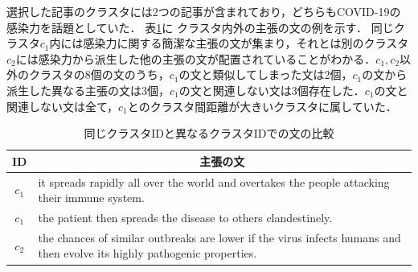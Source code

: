 \documentclass[a4paper, twocolumn, 10pt]{jarticle}
\begin{document}


選択した記事のクラスタには2つの記事が含まれており，どちらもCOVID-19の感染力を話題としていた．
表\ref{clustering_result_samples}に
クラスタ内外の主張の文の例を示す．
同じクラスタ$c_1$内には感染力に関する簡潔な主張の文が集まり，それとは別のクラスタ$c_2$には感染力から派生した他の主張の文が配置されていることがわかる．$c_1, c_2$以外のクラスタの8個の文のうち，$c_1$の文と類似してしまった文は2個，$c_1$の文から派生した異なる主張の文は3個，$c_1$の文と関連しない文は3個存在した．$c_1$の文と関連しない文は全て，$c_1$とのクラスタ間距離が大きいクラスタに属していた．

\begin{table}[H]
  \caption{
      同じクラスタIDと異なるクラスタIDでの文の比較
    }
  \centering
  {\tabcolsep=0.05cm
    \begin{tabular}{cp{7.5cm}}
    \hline
    ID & \multicolumn{1}{c}{主張の文}
    \\
    \hline
    $c_1$ & it spreads rapidly all over the world and overtakes the people attacking their immune system.
    \\
    $c_1$ & the patient then spreads the disease to others clandestinely.
    \\
    $c_2$ & the chances of similar outbreaks are lower if the virus infects humans and then evolve its highly pathogenic properties.
    \\
    \hline
    \end{tabular}
  }
  \label{clustering_result_samples}
\end{table}
\end{document}
